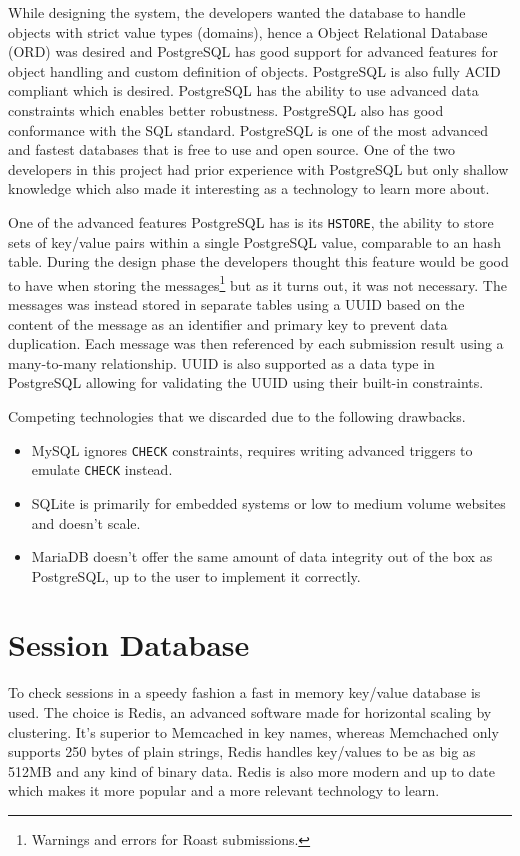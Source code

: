 \documentclass[12pt,a4paper]{report}
\begin{document}
While designing the system, the developers wanted the database to handle objects with strict value types (domains), hence a Object Relational Database (ORD) was desired and PostgreSQL has good support for advanced features for object handling and custom definition of objects. PostgreSQL is also fully ACID compliant\cite{pg-acid} which is desired. PostgreSQL has the ability to use advanced data constraints which enables better robustness. PostgreSQL also has good conformance with the SQL standard\cite{pg-sql-conformance}. PostgreSQL is one of the most advanced and fastest databases\cite{db-benchmark} that is free to use and open source.
One of the two developers in this project had prior experience with PostgreSQL but only shallow knowledge which also made it interesting as a technology to learn more about.

One of the advanced features PostgreSQL has is its \texttt{HSTORE}, the ability to store sets of key/value pairs within a single PostgreSQL value\cite{pg-hstore}, comparable to an hash table. During the design phase the developers thought this feature would be good to have when storing the messages\footnote{Warnings and errors for Roast submissions.} but as it turns out, it was not necessary. The messages was instead stored in separate tables using a UUID based on the content of the message as an identifier and primary key to prevent data duplication. Each message was then referenced by each submission result using a many-to-many relationship. UUID is also supported as a data type in PostgreSQL\cite{pg-uuid} allowing for validating the UUID using their built-in constraints.

Competing technologies that we discarded due to the following drawbacks.
\begin{itemize}
    \item MySQL ignores \texttt{CHECK} constraints\cite{mysql-check-constraint}, requires writing advanced triggers to emulate \texttt{CHECK} instead\cite{mysql-emulate-check}.
    \item SQLite is primarily for embedded systems or low to medium volume websites and doesn't scale\cite{sqlite-when-to-use}.
    \item MariaDB doesn't offer the same amount of data integrity out of the box as \\ PostgreSQL\cite{mariadb-data-integrity}, up to the user to implement it correctly. 
\end{itemize}

\section{Session Database}
To check sessions in a speedy fashion a fast in memory key/value database is used. The choice is Redis, an advanced software made for horizontal scaling by clustering. It's superior to Memcached in key names, whereas Memchached only supports 250 bytes of plain strings, Redis handles key/values to be as big as 512MB and any kind of binary data. Redis is also more modern and up to date which makes it more popular and a more relevant technology to learn. 
\end{document}
